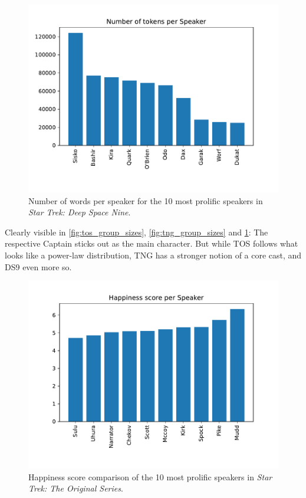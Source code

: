 \begin{figure}
  \centering
  \includegraphics[width=\columnwidth]{figures/localized/ds9_group_sizes.pdf}
  \caption{Number of words per speaker for the 10 most prolific speakers in \textit{Star Trek: Deep Space Nine}.}
  \label{fig:ds9_group_sizes}
\end{figure}

Clearly visible in \ref{fig:tos_group_sizes}, \ref{fig:tng_group_sizes} and \ref{fig:ds9_group_sizes}: The respective Captain sticks out as the main character. But while TOS follows what looks like a power-law distribution, TNG has a stronger notion of a core cast, and DS9 even more so.

\begin{figure}
  \centering
  \includegraphics[width=\columnwidth]{figures/localized/tos_happiness_scores.pdf}
  \caption{Happiness score comparison of the 10 most prolific speakers in \textit{Star Trek: The Original Series}.}
  \label{fig:tos_happiness}
\end{figure}

